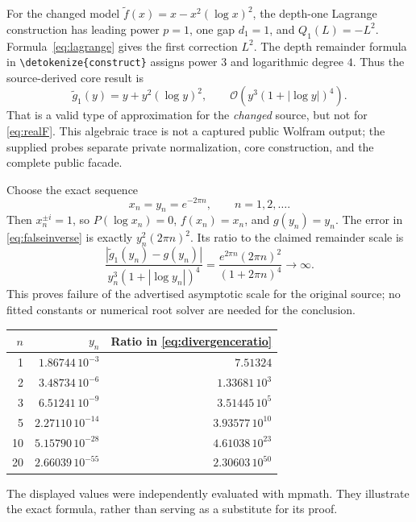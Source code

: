 \documentclass[11pt,a4paper]{article}
\newcommand{\wl}[1]{\texttt{\expandafter\nolinkurl\expandafter{\detokenize{#1}}}}
\newcommand{\OO}{\mathcal{O}}
\begin{document}
For the changed model $\widetilde f(x)=x-x^2(\log x)^2$, the depth-one
Lagrange construction has leading power $p=1$, one gap $d_1=1$, and
$Q_1(L)=-L^2$. Formula~\eqref{eq:lagrange} gives the first correction $L^2$.
The depth remainder formula in \wl{construct} assigns power $3$ and logarithmic
degree $4$. Thus the source-derived core result is
\begin{equation}\label{eq:falseinverse}
 \widetilde g_1(y)=y+y^2(\log y)^2,
 \qquad \OO\!\left(y^3(1+|\log y|)^4\right).
\end{equation}
That is a valid type of approximation for the \emph{changed} source, but not
for \eqref{eq:realF}. This algebraic trace is not a captured public Wolfram
output; the supplied probes separate private normalization, core construction,
and the complete public facade.\cite{core}

Choose the exact sequence
\[
 x_n=y_n=e^{-2\pi n},\qquad n=1,2,\ldots.
\]
Then $x_n^{\pm i}=1$, so $P(\log x_n)=0$, $f(x_n)=x_n$, and
$g(y_n)=y_n$. The error in \eqref{eq:falseinverse} is exactly
$y_n^2(2\pi n)^2$. Its ratio to the claimed remainder scale is
\begin{equation}\label{eq:divergenceratio}
 \frac{|\widetilde g_1(y_n)-g(y_n)|}
      {y_n^3(1+|\log y_n|)^4}
 =\frac{e^{2\pi n}(2\pi n)^2}{(1+2\pi n)^4}
 \longrightarrow\infty.
\end{equation}
This proves failure of the advertised asymptotic scale for the original source;
no fitted constants or numerical root solver are needed for the conclusion.

\begin{center}
\begin{tabular}{@{}rrr@{}}
\toprule
$n$ & $y_n$ & Ratio in \eqref{eq:divergenceratio}\\
\midrule
1 & $1.86744\,10^{-3}$ & $7.51324$\\
2 & $3.48734\,10^{-6}$ & $1.33681\,10^{3}$\\
3 & $6.51241\,10^{-9}$ & $3.51445\,10^{5}$\\
5 & $2.27110\,10^{-14}$ & $3.93577\,10^{10}$\\
10 & $5.15790\,10^{-28}$ & $4.61038\,10^{23}$\\
20 & $2.66039\,10^{-55}$ & $2.30603\,10^{50}$\\
\bottomrule
\end{tabular}
\end{center}
The displayed values were independently evaluated with mpmath. They illustrate
the exact formula, rather than serving as a substitute for its proof.
\end{document}
